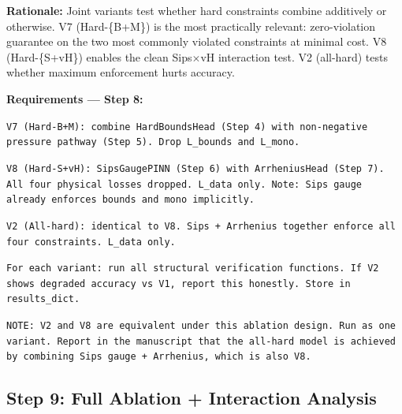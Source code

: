 \documentclass[12pt,a4paper]{article}
\begin{document}
\begin{rationalebox}
\textbf{Rationale:} Joint variants test whether hard constraints combine
additively or otherwise. V7 (Hard-\{B+M\}) is the most practically
relevant: zero-violation guarantee on the two most commonly violated
constraints at minimal cost. V8 (Hard-\{S+vH\}) enables the clean
Sips$\times$vH interaction test. V2 (all-hard) tests whether maximum
enforcement hurts accuracy.
\end{rationalebox}

\begin{promptbox}
\textbf{Requirements --- Step 8:}

\texttt{V7 (Hard-B+M): combine HardBoundsHead (Step 4) with non-negative
pressure pathway (Step 5). Drop L\_bounds and L\_mono.}

\texttt{V8 (Hard-S+vH): SipsGaugePINN (Step 6) with ArrheniusHead
(Step 7). All four physical losses dropped. L\_data only.
Note: Sips gauge already enforces bounds and mono implicitly.}

\texttt{V2 (All-hard): identical to V8. Sips + Arrhenius together
enforce all four constraints. L\_data only.}

\texttt{For each variant: run all structural verification functions.
If V2 shows degraded accuracy vs V1, report this honestly.
Store in results\_dict.}

\texttt{NOTE: V2 and V8 are equivalent under this ablation design.
Run as one variant. Report in the manuscript that the all-hard model
is achieved by combining Sips gauge + Arrhenius, which is also V8.}
\end{promptbox}

\subsection{Step 9: Full Ablation + Interaction Analysis}
\end{document}
